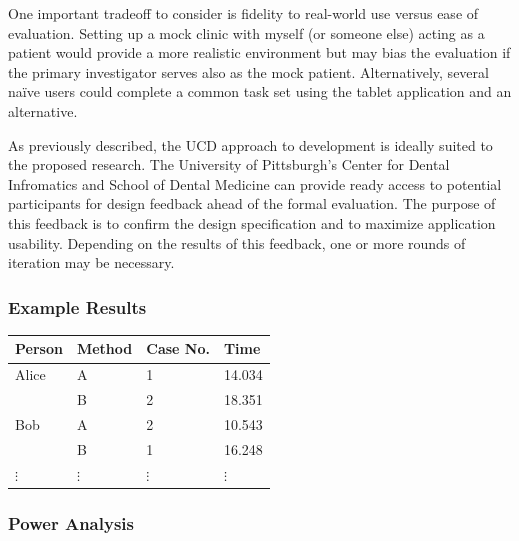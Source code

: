 \documentclass[11pt]{article}
\newcommand{\ra}[1]{\renewcommand{\arraystretch}{#1}}
\begin{document}
One important tradeoff to consider is fidelity to real-world use versus ease of evaluation. Setting up a mock clinic with myself (or someone else) acting as a patient would provide a more realistic environment but may bias the evaluation if the primary investigator serves also as the mock patient. Alternatively, several na\"{i}ve users could complete a common task set using the tablet application and an alternative.

As previously described, the UCD approach to development is ideally suited to the proposed research. The University of Pittsburgh's Center for Dental Infromatics and School of Dental Medicine can provide ready access to potential participants for design feedback ahead of the formal evaluation. The purpose of this feedback is to confirm the design specification and to maximize application usability. Depending on the results of this feedback, one or more rounds of iteration may be necessary.

\subsubsection{Example Results}

\begin{table}[h]
\begin{center}
\ra{1.3}
\begin{tabular}{l l l l}
\toprule
\textbf{Person}  &  \textbf{Method}	&	\textbf{Case No.}  &  \textbf{Time} \\
\midrule
Alice & A		&	1				&	14.034  \\
      & B		&	2				&	18.351  \\
Bob & A		&	2				&	10.543  \\
    & B		&	1				&	16.248  \\
$\vdots$ & $\vdots$ & $\vdots$ & $\vdots$  \\
\bottomrule
\end{tabular}\end{center}\end{table}

\subsubsection{Power Analysis}
\end{document}
